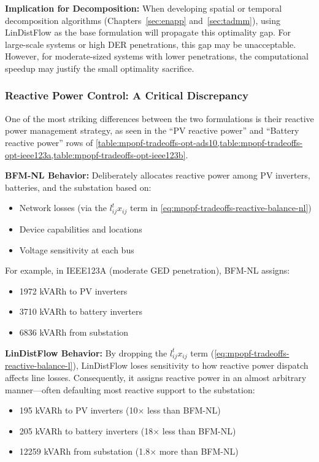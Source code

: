 \textbf{Implication for Decomposition:} When developing spatial or temporal decomposition algorithms (Chapters~\ref{sec:enapp} and~\ref{sec:tadmm}), using LinDistFlow as the base formulation will propagate this optimality gap. For large-scale systems or high DER penetrations, this gap may be unacceptable. However, for moderate-sized systems with lower penetrations, the computational speedup may justify the small optimality sacrifice.

\subsubsection{Reactive Power Control: A Critical Discrepancy}

One of the most striking differences between the two formulations is their reactive power management strategy, as seen in the ``PV reactive power'' and ``Battery reactive power'' rows of \cref{table:mpopf-tradeoffs-opt-ads10,table:mpopf-tradeoffs-opt-ieee123a,table:mpopf-tradeoffs-opt-ieee123b}.

\textbf{BFM-NL Behavior:} Deliberately allocates reactive power among PV inverters, batteries, and the substation based on:
\begin{itemize}
    \item Network losses (via the \(l_{ij}^t x_{ij}\) term in \cref{eq:mpopf-tradeoffs-reactive-balance-nl})
    \item Device capabilities and locations
    \item Voltage sensitivity at each bus
\end{itemize}

For example, in IEEE123A (moderate GED penetration), BFM-NL assigns:
\begin{itemize}
    \item 1972 kVARh to PV inverters
    \item 3710 kVARh to battery inverters
    \item 6836 kVARh from substation
\end{itemize}

\textbf{LinDistFlow Behavior:} By dropping the \(l_{ij}^t x_{ij}\) term (\cref{eq:mpopf-tradeoffs-reactive-balance-l}), LinDistFlow loses sensitivity to how reactive power dispatch affects line losses. Consequently, it assigns reactive power in an almost arbitrary manner—often defaulting most reactive support to the substation:
\begin{itemize}
    \item 195 kVARh to PV inverters (10× less than BFM-NL)
    \item 205 kVARh to battery inverters (18× less than BFM-NL)
    \item 12259 kVARh from substation (1.8× more than BFM-NL)
\end{itemize}

